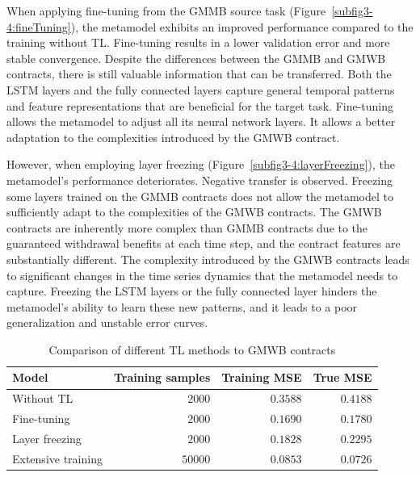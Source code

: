 When applying fine-tuning from the GMMB source task (Figure~\ref{subfig3-4:fineTuning}), the metamodel exhibits an improved performance compared to the training without TL. 
Fine-tuning results in a lower validation error and more stable convergence.
Despite the differences between the GMMB and GMWB contracts, there is still valuable information that can be transferred. 
Both the LSTM layers and the fully connected layers capture general temporal patterns and feature representations that are beneficial for the target task. 
Fine-tuning allows the metamodel to adjust all its neural network layers. 
It allows a better adaptation to the complexities introduced by the GMWB contract.

However, when employing layer freezing (Figure~\ref{subfig3-4:layerFreezing}), the metamodel's performance deteriorates.
Negative transfer is observed.
Freezing some layers trained on the GMMB contracts does not allow the metamodel to sufficiently adapt to the complexities of the GMWB contracts. 
The GMWB contracts are inherently more complex than GMMB contracts due to the guaranteed withdrawal benefits at each time step, and the contract features are substantially different.
The complexity introduced by the GMWB contracts leads to significant changes in the time series dynamics that the metamodel needs to capture.
Freezing the LSTM layers or the fully connected layer hinders the metamodel's ability to learn these new patterns, and it leads to a poor generalization and unstable error curves.

\begin{table}[ht!]
    \centering
    \begin{tabular}{lrrr}
        \toprule
        \textbf{Model} & \textbf{Training samples} & \textbf{Training MSE} & \textbf{True MSE} \\
        \midrule
        Without TL & $\num{2000}$ & $0.3588$ & $0.4188$ \\
        Fine-tuning & $\num{2000}$ & $0.1690$ & $0.1780$ \\
        Layer freezing & $\num{2000}$ & $0.1828$ & $0.2295$ \\
        Extensive training & $\num{50000}$ & $0.0853$ & $0.0726$ \\
        \bottomrule
    \end{tabular}
    \caption{Comparison of different TL methods to GMWB contracts}
    \label{tab3:transfer_learning_results_gmwb}
\end{table}

